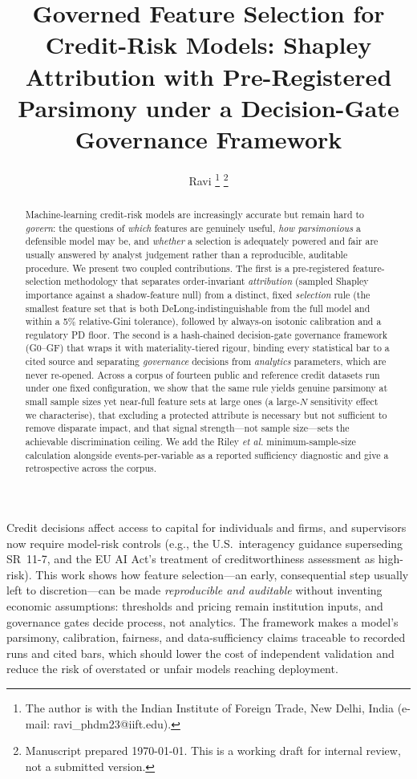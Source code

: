 \documentclass[9pt,journal]{IEEEtai}
\title{Governed Feature Selection for Credit-Risk Models: Shapley Attribution with Pre-Registered Parsimony under a Decision-Gate Governance Framework}
\author{Ravi\IEEEauthorrefmark{1}
\thanks{\IEEEauthorrefmark{1}The author is with the Indian Institute of Foreign Trade, New Delhi, India (e-mail: ravi\_phdm23@iift.edu).}
\thanks{Manuscript prepared \today. This is a working draft for internal review, not a submitted version.}}
\begin{document}
\maketitle

\begin{abstract}
Machine-learning credit-risk models are increasingly accurate but remain hard to
\emph{govern}: the questions of \emph{which} features are genuinely useful, \emph{how
parsimonious} a defensible model may be, and \emph{whether} a selection is adequately
powered and fair are usually answered by analyst judgement rather than a reproducible,
auditable procedure. We present two coupled contributions. The first is a pre-registered
feature-selection methodology that separates order-invariant \emph{attribution} (sampled
Shapley importance against a shadow-feature null) from a distinct, fixed \emph{selection}
rule (the smallest feature set that is both DeLong-indistinguishable from the full model and
within a 5\% relative-Gini tolerance), followed by always-on isotonic calibration and a
regulatory PD floor. The second is a hash-chained decision-gate governance framework
(G0--GF) that wraps it with materiality-tiered rigour, binding every statistical bar to a
cited source and separating \emph{governance} decisions from \emph{analytics} parameters,
which are never re-opened. Across a corpus of
fourteen public and reference credit datasets run under one fixed configuration, we show that
the same rule yields genuine parsimony at small sample sizes yet near-full feature sets at
large ones (a large-$N$ sensitivity effect we characterise), that excluding a protected
attribute is necessary but not sufficient to remove disparate impact, and that signal
strength---not sample size---sets the achievable discrimination ceiling. We add the Riley
\emph{et al.} minimum-sample-size calculation alongside events-per-variable as a reported
sufficiency diagnostic and give a retrospective across the corpus.
\end{abstract}

\begin{IEEEImpStatement}
Credit decisions affect access to capital for individuals and firms, and supervisors now
require model-risk controls (e.g., the U.S.\ interagency guidance superseding SR~11-7, and
the EU AI Act's treatment of creditworthiness assessment as high-risk). This work shows how
feature selection---an early, consequential step usually left to discretion---can be made
\emph{reproducible and auditable} without inventing economic assumptions: thresholds and
pricing remain institution inputs, and governance gates decide process, not analytics. The
framework makes a model's parsimony, calibration, fairness, and data-sufficiency claims
traceable to recorded runs and cited bars, which should lower the cost of independent
validation and reduce the risk of overstated or unfair models reaching deployment.
\end{IEEEImpStatement}
\end{document}
